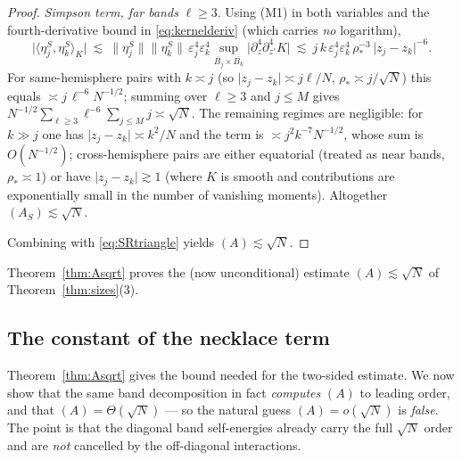 \documentclass[11pt,reqno]{amsart}
\theoremstyle{definition}
\newcommand{\inner}[2]{\langle #1,#2\rangle}
\newcommand{\eps}{\varepsilon}
\newcommand{\ol}{\overline}
\newcommand{\abs}[1]{\lvert #1\rvert}
\newcommand{\rp}{\rho}
\newcommand{\lesss}{\lesssim}
\begin{document}
\begin{proof}
\emph{Simpson term, far bands} $\ell\ge3$. Using (M1) in both variables and the fourth-derivative bound
in \eqref{eq:kernelderiv} (which carries \emph{no} logarithm),
\[
   \lvert\inner{\eta_j^S}{\eta_k^S}_K\rvert
   \ \lesss\ \lVert\eta_j^S\rVert\lVert\eta_k^S\rVert\,\eps_j^4\eps_k^4\!\!
   \sup_{\ol{B_j}\times\ol{B_k}}\!\!\lvert\partial_z^4\partial_{z'}^4K\rvert
   \ \lesss\ j\,k\,\eps_j^4\eps_k^4\,\rp_\ast^{-3}\,\abs{z_j-z_k}^{-6}.
\]
For same-hemisphere pairs with $k\asymp j$ (so $\abs{z_j-z_k}\asymp j\ell/N$, $\rp_\ast\asymp j/\sqrt N$)
this equals $\asymp j\,\ell^{-6}N^{-1/2}$; summing over $\ell\ge3$ and $j\le M$ gives
$N^{-1/2}\sum_{\ell\ge3}\ell^{-6}\sum_{j\le M}j\asymp\sqrt N$. The remaining regimes are negligible: for
$k\gg j$ one has $\abs{z_j-z_k}\asymp k^2/N$ and the term is $\asymp j^2k^{-7}N^{-1/2}$, whose sum is
$O(N^{-1/2})$; cross-hemisphere pairs are either equatorial (treated as near bands, $\rp_\ast\asymp1$) or
have $\abs{z_j-z_k}\gtrsim1$ (where $K$ is smooth and contributions are exponentially small in the number
of vanishing moments). Altogether $(A_S)\lesss\sqrt N$.

Combining with \eqref{eq:SRtriangle} yields $(A)\lesss\sqrt N$.
\end{proof}

Theorem~\ref{thm:Asqrt} proves the (now unconditional) estimate $(A)\lesss\sqrt N$ of
Theorem~\ref{thm:sizes}(3).

\subsection{The constant of the necklace term}\label{ssec:exact}
Theorem~\ref{thm:Asqrt} gives the bound needed for the two-sided estimate. We now show that the same
band decomposition in fact \emph{computes} $(A)$ to leading order, and that $(A)=\Theta(\sqrt N)$ ---
so the natural guess $(A)=o(\sqrt N)$ is \emph{false}. The point is that the diagonal band
self-energies already carry the full $\sqrt N$ order and are \emph{not} cancelled by the off-diagonal
interactions.
\end{document}
